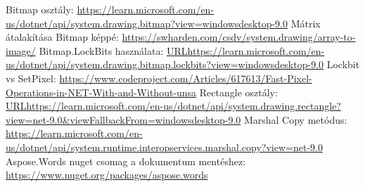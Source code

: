 \documentclass[]{thesis-ekf}
\theoremstyle{definition}
\theoremstyle{remark}
\begin{document}
\begin{thebibliography}{9}
 Bitmap osztály: \url{https://learn.microsoft.com/en-us/dotnet/api/system.drawing.bitmap?view=windowsdesktop-9.0}
 Mátrix átalakítása Bitmap képpé: \url{https://swharden.com/csdv/system.drawing/array-to-image/}
 Bitmap.LockBits használata: \url{URLhttps://learn.microsoft.com/en-us/dotnet/api/system.drawing.bitmap.lockbits?view=windowsdesktop-9.0}
 Lockbit vs SetPixel: \url{https://www.codeproject.com/Articles/617613/Fast-Pixel-Operations-in-NET-With-and-Without-unsa}
 Rectangle osztály: \url{URLhttps://learn.microsoft.com/en-us/dotnet/api/system.drawing.rectangle?view=net-9.0&viewFallbackFrom=windowsdesktop-9.0}
 Marshal Copy metódus: \url{https://learn.microsoft.com/en-us/dotnet/api/system.runtime.interopservices.marshal.copy?view=net-9.0}
 Aspose.Words nuget csomag a dokumentum mentéshez:  \url{https://www.nuget.org/packages/aspose.words}
\end{thebibliography}


\end{document}
